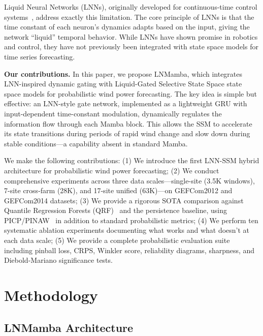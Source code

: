 \documentclass[review]{elsarticle}
\begin{document}
Liquid Neural Networks (LNNs), originally developed for continuous-time control systems~\cite{hasani2021liquid}, address exactly this limitation. The core principle of LNNs is that the time constant of each neuron's dynamics adapts based on the input, giving the network ``liquid'' temporal behavior. While LNNs have shown promise in robotics and control, they have not previously been integrated with state space models for time series forecasting.

\textbf{Our contributions.} In this paper, we propose LNMamba, which integrates LNN-inspired dynamic gating with Liquid-Gated Selective State Space state space models for probabilistic wind power forecasting. The key idea is simple but effective: an LNN-style gate network, implemented as a lightweight GRU with input-dependent time-constant modulation, dynamically regulates the information flow through each Mamba block. This allows the SSM to accelerate its state transitions during periods of rapid wind change and slow down during stable conditions---a capability absent in standard Mamba.

We make the following contributions: (1) We introduce the first LNN-SSM hybrid architecture for probabilistic wind power forecasting; (2) We conduct comprehensive experiments across three data scales---single-site (3.5K windows), 7-site cross-farm (28K), and 17-site unified (63K)---on GEFCom2012 and GEFCom2014 datasets; (3) We provide a rigorous SOTA comparison against Quantile Regression Forests (QRF)~\cite{meinshausen2006quantile} and the persistence baseline, using PICP/PINAW~\cite{khosravi2011comprehensive} in addition to standard probabilistic metrics; (4) We perform ten systematic ablation experiments documenting what works and what doesn't at each data scale; (5) We provide a complete probabilistic evaluation suite including pinball loss, CRPS, Winkler score, reliability diagrams, sharpness, and Diebold-Mariano significance tests.

\section{Methodology}

\subsection{LNMamba Architecture}
\end{document}
